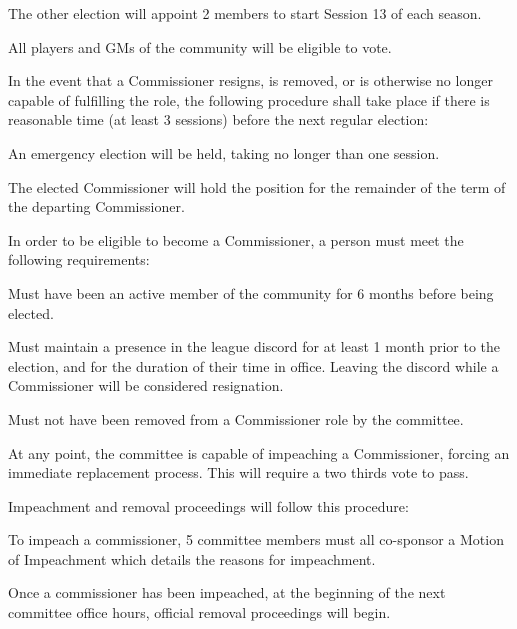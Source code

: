 \begin{deepEnumerate}
\begin{deepEnumerate}
		\item The other election will appoint 2 members to start Session 13 of each season.
		\item All players and GMs of the community will be eligible to vote.
	\end{deepEnumerate}
	\item In the event that a Commissioner resigns, is removed, 
	or is otherwise no longer capable of fulfilling the role, 
	the following procedure shall take place 
	if there is reasonable time (at least 3 sessions) 
	before the next regular election:
	\begin{deepEnumerate}
		\item An emergency election will be held, taking no longer than one session.
		\item The elected Commissioner will hold the position for the remainder of the term of the departing Commissioner.
	\end{deepEnumerate}
	\item In order to be eligible to become a Commissioner, 
	a person must meet the following requirements:
	\begin{deepEnumerate}
		\item Must have been an active member of the community for 6 months before being elected.
		\item Must maintain a presence in the league discord 
		for at least 1 month prior to the election, 
		and for the duration of their time in office. 
		Leaving the discord while a Commissioner will be considered resignation.
		\item Must not have been removed from a Commissioner role by the committee.	
	\end{deepEnumerate}
	\item At any point, the committee is capable of impeaching a Commissioner, 
	forcing an immediate replacement process. 
	This will require a two thirds vote to pass.
	\begin{deepEnumerate}
		\item Impeachment and removal proceedings will follow this procedure:
		\begin{deepEnumerate}
			\item To impeach a commissioner, 
			5 committee members must all co-sponsor a Motion of Impeachment 
			which details the reasons for impeachment.
			\item Once a commissioner has been impeached, 
			at the beginning of the next committee office hours, 
			official removal proceedings will begin. 

\end{deepEnumerate}
\end{deepEnumerate}
\end{deepEnumerate}
